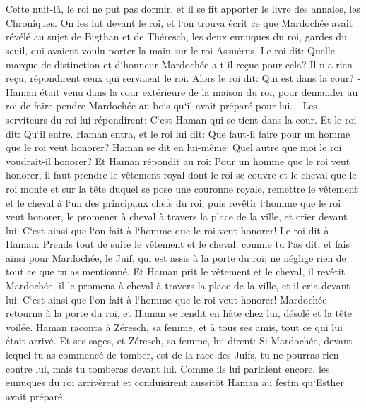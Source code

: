 \chapter{}

\verse Cette nuit-là, le roi ne put pas dormir, et il se fit apporter le livre des annales, les Chroniques. On les lut devant le roi, 
\verse et l`on trouva écrit ce que Mardochée avait révélé au sujet de Bigthan et de Théresch, les deux eunuques du roi, gardes du seuil, qui avaient voulu porter la main sur le roi Assuérus. 
\verse Le roi dit: Quelle marque de distinction et d`honneur Mardochée a-t-il reçue pour cela? Il n`a rien reçu, répondirent ceux qui servaient le roi. 
\verse Alors le roi dit: Qui est dans la cour? -Haman était venu dans la cour extérieure de la maison du roi, pour demander au roi de faire pendre Mardochée au bois qu`il avait préparé pour lui. - 
\verse Les serviteurs du roi lui répondirent: C`est Haman qui se tient dans la cour. Et le roi dit: Qu`il entre. 
\verse Haman entra, et le roi lui dit: Que faut-il faire pour un homme que le roi veut honorer? Haman se dit en lui-même: Quel autre que moi le roi voudrait-il honorer? 
\verse Et Haman répondit au roi: Pour un homme que le roi veut honorer, 
\verse il faut prendre le vêtement royal dont le roi se couvre et le cheval que le roi monte et sur la tête duquel se pose une couronne royale, 
\verse remettre le vêtement et le cheval à l`un des principaux chefs du roi, puis revêtir l`homme que le roi veut honorer, le promener à cheval à travers la place de la ville, et crier devant lui: C`est ainsi que l`on fait à l`homme que le roi veut honorer! 
\verse Le roi dit à Haman: Prends tout de suite le vêtement et le cheval, comme tu l`as dit, et fais ainsi pour Mardochée, le Juif, qui est assis à la porte du roi; ne néglige rien de tout ce que tu as mentionné. 
\verse Et Haman prit le vêtement et le cheval, il revêtit Mardochée, il le promena à cheval à travers la place de la ville, et il cria devant lui: C`est ainsi que l`on fait à l`homme que le roi veut honorer! 
\verse Mardochée retourna à la porte du roi, et Haman se rendit en hâte chez lui, désolé et la tête voilée. 
\verse Haman raconta à Zéresch, sa femme, et à tous ses amis, tout ce qui lui était arrivé. Et ses sages, et Zéresch, sa femme, lui dirent: Si Mardochée, devant lequel tu as commencé de tomber, est de la race des Juifs, tu ne pourras rien contre lui, mais tu tomberas devant lui. 
\verse Comme ils lui parlaient encore, les eunuques du roi arrivèrent et conduisirent aussitôt Haman au festin qu`Esther avait préparé. 

